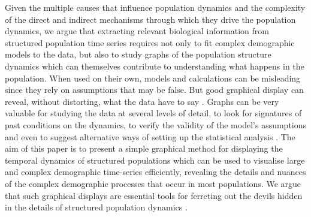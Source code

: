 Given the multiple causes that influence population dynamics and the complexity
of the direct and indirect mechanisms through which they drive the population
dynamics, we argue that extracting relevant biological information from
structured population time series requires not only to fit complex demographic
models to the data, but also to study graphs of the population structure
dynamics which can themselves contribute to understanding what happens in the
population. When used on their own, models and calculations can be misleading
since they rely on assumptions that may be false. But good graphical display can
reveal, without distorting, what the data have to say
\autocites{tufte2001a}.
Graphs can be very valuable for studying the data at several levels of detail, to look for
signatures of past conditions on the dynamics, to verify the validity of the
model’s assumptions and even to suggest alternative ways of setting up the
statistical analysis \autocites{anscombe1973a}. The aim of this paper is
to present a simple graphical method for displaying the temporal dynamics of structured
populations which can be used to visualise large and complex demographic
time-series efficiently, revealing the details and nuances of the complex
demographic processes that occur in most populations. We argue that such
graphical displays are essential tools for ferreting out the devils hidden in
the details of structured population dynamics \autocites{benton2006a}.

